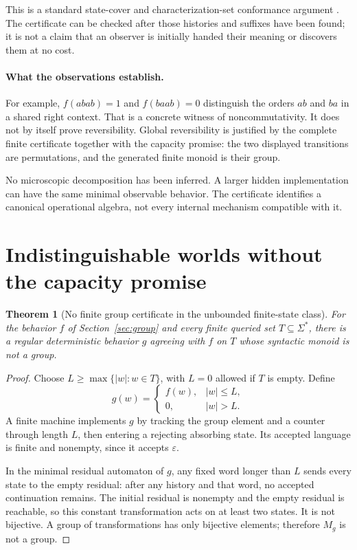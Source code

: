 \documentclass[11pt]{article}
\newtheorem{theorem}{Theorem}[section]
\theoremstyle{remark}
\newcommand{\eps}{\varepsilon}
\begin{document}
This is a standard state-cover and characterization-set conformance argument \cite{Chow,Fujiwara}. The certificate can be checked after those histories and suffixes have been found; it is not a claim that an observer is initially handed their meaning or discovers them at no cost.

\paragraph{What the observations establish.}
For example, $f(abab)=1$ and $f(baab)=0$ distinguish the orders $ab$ and $ba$ in a shared right context. That is a concrete witness of noncommutativity. It does not by itself prove reversibility. Global reversibility is justified by the complete finite certificate together with the capacity promise: the two displayed transitions are permutations, and the generated finite monoid is their group.

No microscopic decomposition has been inferred. A larger hidden implementation can have the same minimal observable behavior. The certificate identifies a canonical operational algebra, not every internal mechanism compatible with it.

\section{Indistinguishable worlds without the capacity promise}
\label{sec:ambiguity}

\begin{theorem}[No finite group certificate in the unbounded finite-state class]
\label{thm:negative}
For the behavior $f$ of Section~\ref{sec:group} and every finite queried set $T\subseteq\Sigma^*$, there is a regular deterministic behavior $g$ agreeing with $f$ on $T$ whose syntactic monoid is not a group.
\end{theorem}
\begin{proof}
Choose $L\ge\max\{|w|:w\in T\}$, with $L=0$ allowed if $T$ is empty. Define
\[
 g(w)=\begin{cases}f(w),&|w|\le L,\\0,&|w|>L.\end{cases}
\]
A finite machine implements $g$ by tracking the group element and a counter through length $L$, then entering a rejecting absorbing state. Its accepted language is finite and nonempty, since it accepts $\eps$.

In the minimal residual automaton of $g$, any fixed word longer than $L$ sends every state to the empty residual: after any history and that word, no accepted continuation remains. The initial residual is nonempty and the empty residual is reachable, so this constant transformation acts on at least two states. It is not bijective. A group of transformations has only bijective elements; therefore $M_g$ is not a group.
\end{proof}
\end{document}
